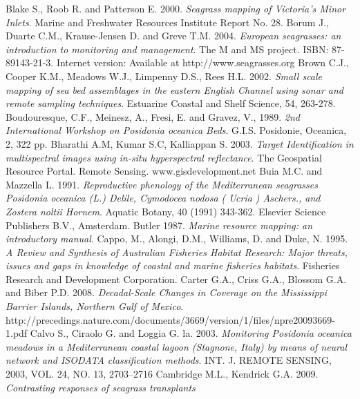 \documentclass[10pt, a4paper]{article}
\begin{document}
\begin{thebibliography}{999}
Blake S., Roob R. and Patterson E. 2000. \emph{Seagrass mapping of Victoria's Minor Inlets}.
Marine and Freshwater Resources Institute Report No. 28. \pageref{Blake00}
Borum J., Duarte C.M., Krause-Jensen D. and Greve T.M. 2004. \emph{European seagrasses:
an introduction to monitoring and management}. The M and MS project. ISBN: 87-89143-21-3.
Internet version: Available at http://www.seagrasses.org \pageref{Borum04}
Brown C.J., Cooper K.M., Meadows W.J., Limpenny D.S., Rees H.L. 2002. \emph{Small scale
mapping of sea bed assemblages in the eastern English Channel using sonar and remote
sampling techniques}. Estuarine Coastal and Shelf Science, 54, 263-278. \pageref{Brown02}
Boudouresque, C.F., Meinesz, A., Fresi, E. and Gravez, V., 1989. \emph{2nd International
Workshop on \textit{Posidonia oceanica} Beds}. G.I.S. Posidonie, Oceanica, 2, 322 pp. \pageref{Boudouresque89}
Bharathi A.M, Kumar S.C, Kalliappan S. 2003. \emph{Target Identification in multispectral images
using in-situ hyperspectral reflectance}. The Geospatial Resource Portal. Remote Sensing.
www.gisdevelopment.net \pageref{Bharathi03}
Buia M.C. and Mazzella L. 1991. \emph{Reproductive phenology of the Mediterranean
seagrasses \textit{Posidonia oceanica} (L.) Delile, Cymodocea nodosa ( Ucria ) Aschers., and
Zostera noltii Hornem}. Aquatic Botany, 40 (1991) 343-362. Elsevier Science Publishers
B.V., Amsterdam. \pageref{Buia91}
Butler 1987. \emph{Marine resource mapping: an introductory manual}. \pageref{Butler87}
Cappo, M., Alongi, D.M., Williams, D. and Duke, N. 1995. \emph{A Review and Synthesis of
Australian Fisheries Habitat Research: Major threats, issues and gaps in knowledge of
coastal and marine fisheries habitats}. Fisheries Research and Development Corporation. \pageref{Cappo95}
Carter G.A., Criss G.A., Blossom G.A. and Biber P.D. 2008. \emph{Decadal-Scale Changes in
Coverage on the Mississippi Barrier Islands, Northern Gulf of Mexico}.
http://precedings.nature.com/documents/3669/version/1/files/npre20093669-1.pdf \pageref{Carter08}
Calvo S., Ciraolo G. and Loggia G. la. 2003. \emph{Monitoring \textit{Posidonia oceanica} meadows
in a Mediterranean coastal lagoon (Stagnone, Italy) by means of neural network and
ISODATA classification methods}. INT. J. REMOTE SENSING, 2003, VOL. 24, NO. 13,
2703–2716 \pageref{Calvo03}
Cambridge M.L., Kendrick G.A. 2009. \emph{Contrasting responses of seagrass transplants
}
\end{thebibliography}
\end{document}
